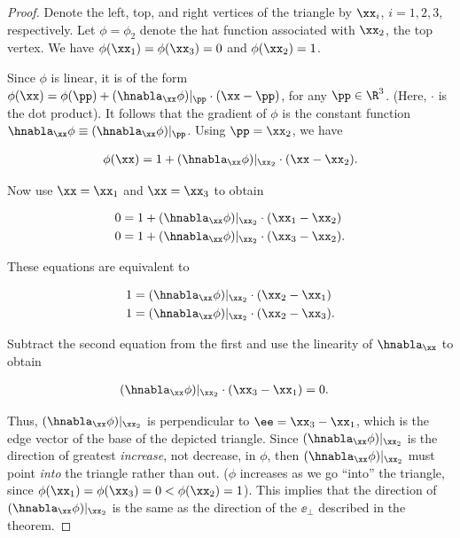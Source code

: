 \begin{proof}
    Denote the left, top, and right vertices of the triangle by $\xx_i$, $i = 1, 2, 3$, respectively. Let $\phi = \phi_2$ denote the hat function associated with $\xx_2$, the top vertex. We have $\phi(\xx_1) = \phi(\xx_3) = 0$ and $\phi(\xx_2) = 1$.
    
    Since $\phi$ is linear, it is of the form $\phi(\xx) = \phi(\pp) + (\hnabla_\xx \phi)|_\pp \cdot (\xx - \pp)$, for any $\pp \in \R^3$. (Here, $\cdot$ is the dot product). It follows that the gradient of $\phi$ is the constant function $\hnabla_\xx \phi \equiv (\hnabla_\xx \phi)|_\pp$. Using $\pp = \xx_2$, we have
    
    \begin{align*}
        \phi(\xx) = 1 + (\hnabla_\xx \phi)|_{\xx_2} \cdot (\xx - \xx_2).
    \end{align*}
    
    Now use $\xx = \xx_1$ and $\xx = \xx_3$ to obtain
    
    \begin{align*}
        0 &= 1 + (\hnabla_\xx \phi)|_{\xx_2} \cdot (\xx_1 - \xx_2) \\
        0 &= 1 + (\hnabla_\xx \phi)|_{\xx_2} \cdot (\xx_3 - \xx_2).
    \end{align*}
    
    These equations are equivalent to
    
    \begin{align*}
        1 &= (\hnabla_\xx \phi)|_{\xx_2} \cdot (\xx_2 - \xx_1) \\
        1 &= (\hnabla_\xx \phi)|_{\xx_2} \cdot (\xx_2 - \xx_3).
    \end{align*}
    
    Subtract the second equation from the first and use the linearity of $\hnabla_\xx$ to obtain
    
    \begin{align*}
        (\hnabla_\xx \phi)|_{\xx_2} \cdot (\xx_3 - \xx_1) &= 0.
    \end{align*}
    
    Thus, $(\hnabla_\xx \phi)|_{\xx_2}$ is perpendicular to $\ee = \xx_3 - \xx_1$, which is the edge vector of the base of the depicted triangle. Since $(\hnabla_\xx \phi)|_{\xx_2}$ is the direction of  greatest \textit{increase}, not decrease, in $\phi$, then $(\hnabla_\xx \phi)|_{\xx_2}$ must point \textit{into} the triangle rather than out. ($\phi$ increases as we go ``into'' the triangle, since ${\phi(\xx_1) = \phi(\xx_3) = 0 < \phi(\xx_2) = 1}$). This implies that the direction of $(\hnabla_\xx \phi)|_{\xx_2}$ is the same as the direction of the $\ee_\perp$ described in the theorem. 
    

\end{proof}
